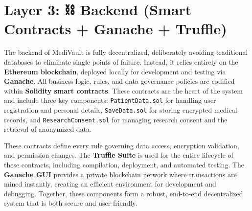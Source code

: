 \section{Layer 3: ⛓️ Backend (Smart Contracts + Ganache + Truffle)}
The backend of MediVault is fully decentralized, deliberately avoiding traditional databases to eliminate single points of failure. Instead, it relies entirely on the \textbf{Ethereum blockchain}, deployed locally for development and testing via \textbf{Ganache}. All business logic, rules, and data governance policies are codified within \textbf{Solidity smart contracts}. These contracts are the heart of the system and include three key components: \texttt{PatientData.sol} for handling user registration and personal details, \texttt{SaveData.sol} for storing encrypted medical records, and \texttt{ResearchConsent.sol} for managing research consent and the retrieval of anonymized data.

These contracts define every rule governing data access, encryption validation, and permission changes. The \textbf{Truffle Suite} is used for the entire lifecycle of these contracts, including compilation, deployment, and automated testing. The \textbf{Ganache GUI} provides a private blockchain network where transactions are mined instantly, creating an efficient environment for development and debugging. Together, these components form a robust, end-to-end decentralized system that is both secure and user-friendly.
